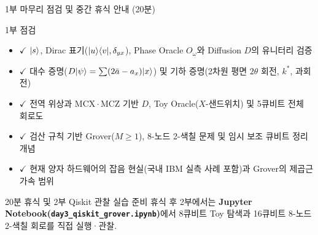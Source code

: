 \documentclass[aspectratio=169, 10pt]{beamer}
\begin{document}
\begin{frame}{1부 마무리 점검 및 중간 휴식 안내 (20분)}
    \begin{qcblock}{1부 점검}
        \begin{itemize}
            \item $\checkmark$ $|s\rangle$, Dirac 표기($|u\rangle\langle v|, \delta_{yx}$), Phase Oracle $O_\omega$와 Diffusion $D$의 유니터리 검증
            \item $\checkmark$ 대수 증명($D|\psi\rangle = \sum(2\bar{a}-a_x)|x\rangle$) 및 기하 증명(2차원 평면 $2\theta$ 회전, $k^*$, 과회전)
            \item $\checkmark$ 전역 위상과 $\mathrm{MCX}\cdot\mathrm{MCZ}$ 기반 $D$, Toy Oracle($X$-샌드위치) 및 5큐비트 전체 회로도
            \item $\checkmark$ 검산 규칙 기반 Grover($M \ge 1$), 8-노드 2-색칠 문제 및 임시 보조 큐비트 정리 개념
            \item $\checkmark$ 현재 양자 하드웨어의 잡음 현실(국내 IBM 실측 사례 포함)과 Grover의 제곱근 가속 범위
        \end{itemize}
    \end{qcblock}
    \vspace{0.15cm}
    \begin{qctip}{20분 휴식 및 2부 Qiskit 관찰 실습 준비}
        휴식 후 2부에서는 \textbf{Jupyter Notebook(\texttt{day3\_qiskit\_grover.ipynb})}에서 8큐비트 Toy 탐색과 16큐비트 8-노드 2-색칠 회로를 직접 실행·관찰.
    \end{qctip}
\end{frame}
\end{document}
